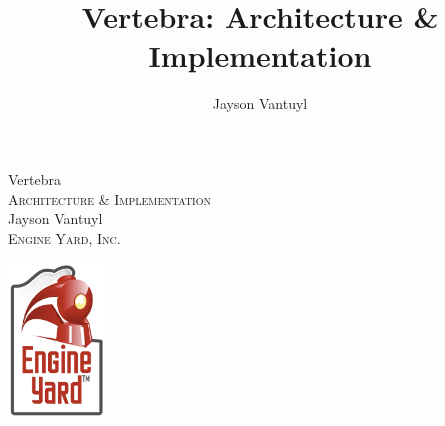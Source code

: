 \title{Vertebra: Architecture \& Implementation}
\author{Jayson Vantuyl}

\begin{titlepage}
\begin{center}

{\LARGE Vertebra}\\[0.5cm]
\textsc{Architecture \& Implementation}\\[2.5cm]

Jayson Vantuyl\\[0.5cm]

\textsc{Engine Yard, Inc.}

\vfill

\includegraphics[width=1in]{figs/png/eylogo}
\end{center}
\end{titlepage}
